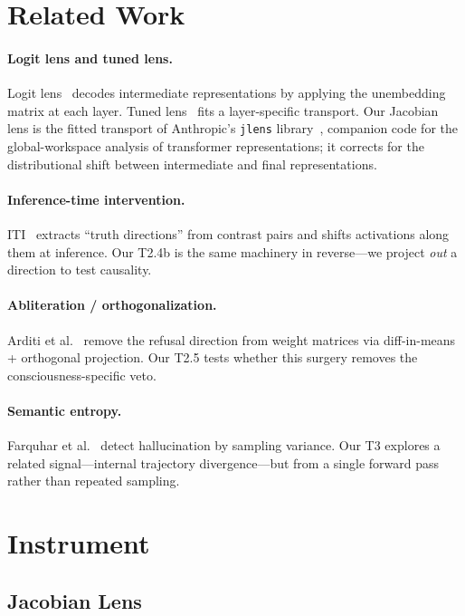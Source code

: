 \documentclass[11pt,a4paper]{article}
\begin{document}
\section{Related Work}

\paragraph{Logit lens and tuned lens.} Logit lens~\cite{nostalgebraist2020} decodes intermediate representations by applying the unembedding matrix at each layer. Tuned lens~\cite{belrose2023tuned} fits a layer-specific transport. Our Jacobian lens is the fitted transport of Anthropic's \texttt{jlens} library~\cite{jacobianlens2026}, companion code for the global-workspace analysis of transformer representations; it corrects for the distributional shift between intermediate and final representations.

\paragraph{Inference-time intervention.} ITI~\cite{li2024inference} extracts ``truth directions'' from contrast pairs and shifts activations along them at inference. Our T2.4b is the same machinery in reverse---we project \emph{out} a direction to test causality.

\paragraph{Abliteration / orthogonalization.} Arditi et al.~\cite{arditi2024refusal} remove the refusal direction from weight matrices via diff-in-means + orthogonal projection. Our T2.5 tests whether this surgery removes the consciousness-specific veto.

\paragraph{Semantic entropy.} Farquhar et al.~\cite{farquhar2024semantic} detect hallucination by sampling variance. Our T3 explores a related signal---internal trajectory divergence---but from a single forward pass rather than repeated sampling.

\section{Instrument}

\subsection{Jacobian Lens}
\end{document}
